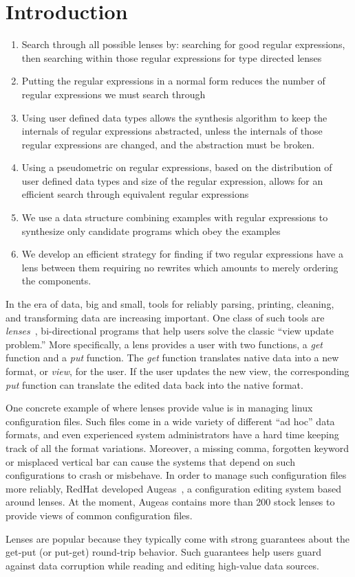 \section{Introduction}


\begin{enumerate}
\item Search through all possible lenses by: searching for good regular
expressions, then searching within those regular expressions for type directed
lenses
\item Putting the regular expressions in a normal form reduces the number of
regular expressions we must search through
\item Using user defined data types allows the synthesis algorithm to keep the
internals of regular expressions abstracted, unless the internals of those
regular expressions are changed, and the abstraction must be broken.
\item Using a pseudometric on regular expressions, based on the
distribution of user defined data types and size of the regular expression,
allows for an efficient search through equivalent regular expressions
\item We use a data structure combining examples with regular expressions to
synthesize only candidate programs which obey the examples
\item We develop an efficient strategy for finding if two
regular expressions have a lens between them requiring no rewrites which amounts
to merely ordering the components.
\end{enumerate}


In the era of data, big and small, tools for reliably parsing,
printing, cleaning, and transforming data are increasing important.
One class of such tools are \emph{lenses}~\cite{?}, bi-directional
programs that help users solve the classic ``view update problem.''
More specifically, a lens provides a user with two functions, a
\emph{get} function and a \emph{put} function.  The \emph{get}
function translates native data into a new format, or \emph{view}, for
the user.  If the user updates the new view, the corresponding
\emph{put} function can translate the edited data back into
the native format.

One concrete example of where lenses provide value is in managing
linux configuration files.  Such files come in a wide variety of
different ``ad hoc'' data formats, and even experienced system
administrators have a hard time keeping track of all the format
variations.  Moreover, a missing comma, forgotten keyword or 
misplaced vertical bar can cause the systems that depend on such
configurations to crash or misbehave.  In order to manage such configuration
files more reliably,  RedHat developed Augeas~\cite{}, a configuration
editing system based around lenses.  At the moment, Augeas contains more
than 200 stock lenses to provide views of common configuration files.

Lenses are popular because they typically come with strong guarantees
about the get-put (or put-get) round-trip behavior.  Such guarantees
help users guard against data corruption while reading and editing
high-value data sources.



